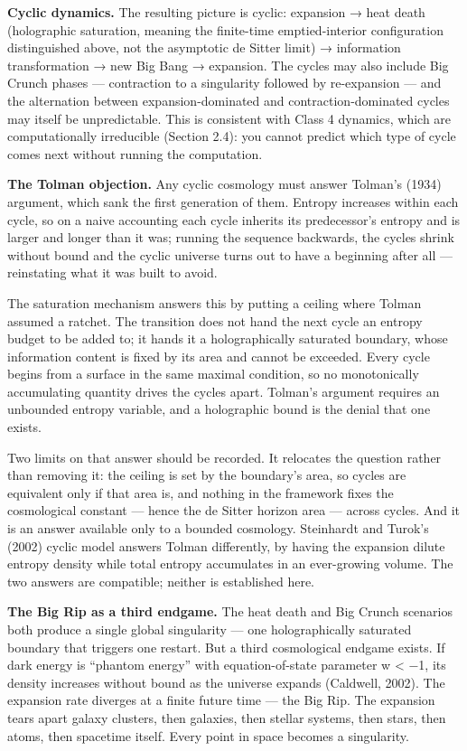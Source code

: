 \documentclass[
]{article}
\begin{document}
\textbf{Cyclic dynamics.} The resulting picture is cyclic: expansion →
heat death (holographic saturation, meaning the finite-time
emptied-interior configuration distinguished above, not the asymptotic
de Sitter limit) → information transformation → new Big Bang →
expansion. The cycles may also include Big Crunch phases --- contraction
to a singularity followed by re-expansion --- and the alternation
between expansion-dominated and contraction-dominated cycles may itself
be unpredictable. This is consistent with Class 4 dynamics, which are
computationally irreducible (Section 2.4): you cannot predict which type
of cycle comes next without running the computation.

\textbf{The Tolman objection.} Any cyclic cosmology must answer Tolman's
(1934) argument, which sank the first generation of them. Entropy
increases within each cycle, so on a naive accounting each cycle
inherits its predecessor's entropy and is larger and longer than it was;
running the sequence backwards, the cycles shrink without bound and the
cyclic universe turns out to have a beginning after all --- reinstating
what it was built to avoid.

The saturation mechanism answers this by putting a ceiling where Tolman
assumed a ratchet. The transition does not hand the next cycle an
entropy budget to be added to; it hands it a holographically saturated
boundary, whose information content is fixed by its area and cannot be
exceeded. Every cycle begins from a surface in the same maximal
condition, so no monotonically accumulating quantity drives the cycles
apart. Tolman's argument requires an unbounded entropy variable, and a
holographic bound is the denial that one exists.

Two limits on that answer should be recorded. It relocates the question
rather than removing it: the ceiling is set by the boundary's area, so
cycles are equivalent only if that area is, and nothing in the framework
fixes the cosmological constant --- hence the de Sitter horizon area ---
across cycles. And it is an answer available only to a bounded
cosmology. Steinhardt and Turok's (2002) cyclic model answers Tolman
differently, by having the expansion dilute entropy density while total
entropy accumulates in an ever-growing volume. The two answers are
compatible; neither is established here.

\textbf{The Big Rip as a third endgame.} The heat death and Big Crunch
scenarios both produce a single global singularity --- one
holographically saturated boundary that triggers one restart. But a
third cosmological endgame exists. If dark energy is ``phantom energy''
with equation-of-state parameter w \textless{} −1, its density increases
without bound as the universe expands (Caldwell, 2002). The expansion
rate diverges at a finite future time --- the Big Rip. The expansion
tears apart galaxy clusters, then galaxies, then stellar systems, then
stars, then atoms, then spacetime itself. Every point in space becomes a
singularity.
\end{document}
